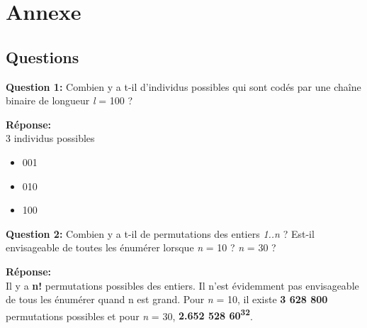 \documentclass[12pt]{report}
\begin{document}
\chapter{Annexe}

\section{Questions}

\textbf{Question 1:} Combien y a t-il d'individus possibles qui sont codés par une chaîne binaire de longueur \textit{l} = 100 ?

\begin{flushleft}
    \textbf{Réponse:}\\
    3 individus possibles
    \begin{itemize}
    \item 001
    \item 010
    \item 100
    \end{itemize}
\end{flushleft}

\textbf{Question 2:} Combien y a t-il de permutations des entiers \textit{1..n} ? Est-il envisageable de toutes les énumérer lorsque \textit{n} = 10 ? \textit{n} = 30 ?

\begin{flushleft}
    \textbf{Réponse:}\\
    Il y a \textbf{n!} permutations possibles des entiers. Il n'est évidemment pas envisageable de tous les énumérer quand n est grand. Pour \textit{n} = 10, il existe \textbf{3 628 800} permutations possibles et pour \textit{n} = 30, \textbf{2.652 528 60\textsuperscript{32}}.
\end{flushleft}
 
\end{document}
